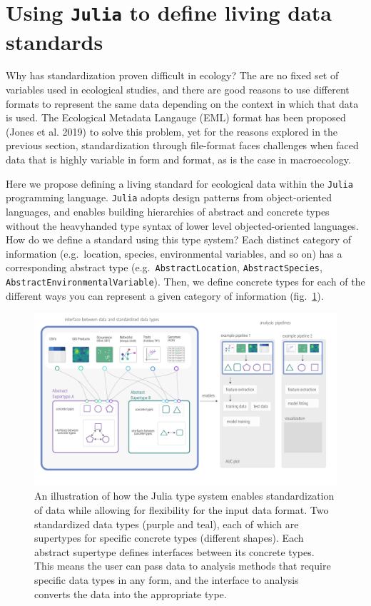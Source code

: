 \documentclass[11pt]{article}
\makeatletter
\def\maxwidth{\ifdim\Gin@nat@width>\linewidth\linewidth
\else\Gin@nat@width\fi}
\let\Oldincludegraphics\includegraphics
\renewcommand{\includegraphics}[1]{\Oldincludegraphics[width=\maxwidth]{#1}}
\makeatother
\begin{document}
\hypertarget{using-julia-to-define-living-data-standards}{%
\section{\texorpdfstring{Using \texttt{Julia} to define living data
standards}{Using Julia to define living data standards}}\label{using-julia-to-define-living-data-standards}}

Why has standardization proven difficult in ecology? The are no fixed
set of variables used in ecological studies, and there are good reasons
to use different formats to represent the same data depending on the
context in which that data is used. The Ecological Metadata Langauge
(EML) format has been proposed (Jones et al. 2019) to solve this
problem, yet for the reasons explored in the previous section,
standardization through file-format faces challenges when faced data
that is highly variable in form and format, as is the case in
macroecology.

Here we propose defining a living standard for ecological data within
the \texttt{Julia} programming language. \texttt{Julia} adopts design
patterns from object-oriented languages, and enables building
hierarchies of abstract and concrete types without the heavyhanded type
syntax of lower level objected-oriented languages. How do we define a
standard using this type system? Each distinct category of information
(e.g.~location, species, environmental variables, and so on) has a
corresponding abstract type (e.g.~\texttt{AbstractLocation},
\texttt{AbstractSpecies}, \texttt{AbstractEnvironmentalVariable}). Then,
we define concrete types for each of the different ways you can
represent a given category of information (fig.~\ref{fig:concept}).

\begin{figure}
\hypertarget{fig:concept}{%
\centering
\includegraphics{./figures/concept.png}
\caption{An illustration of how the Julia type system enables
standardization of data while allowing for flexibility for the input
data format. Two standardized data types (purple and teal), each of
which are supertypes for specific concrete types (different shapes).
Each abstract supertype defines interfaces between its concrete types.
This means the user can pass data to analysis methods that require
specific data types in any form, and the interface to analysis converts
the data into the appropriate type.}\label{fig:concept}
}
\end{figure}
\end{document}
